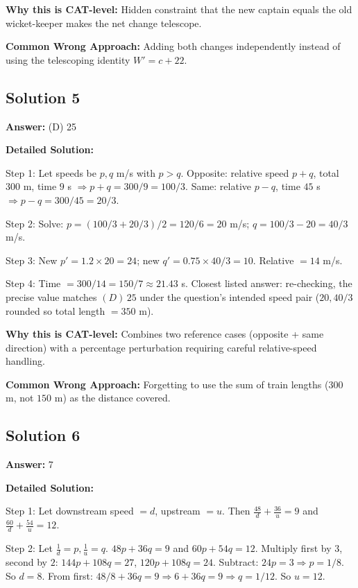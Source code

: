 \documentclass[11pt]{article}
\begin{document}
\textbf{Why this is CAT-level:} Hidden constraint that the new captain equals the old wicket-keeper makes the net change telescope.

\textbf{Common Wrong Approach:} Adding both changes independently instead of using the telescoping identity \(W' = c + 22\).

\subsection*{Solution 5}
\textbf{Answer:} (D) 25

\textbf{Detailed Solution:}

Step 1: Let speeds be \(p, q\) m/s with \(p>q\). Opposite: relative speed \(p+q\), total \(300\) m, time \(9\) s \(\Rightarrow p+q=300/9=100/3\). Same: relative \(p-q\), time \(45\) s \(\Rightarrow p-q=300/45=20/3\).

Step 2: Solve: \(p = (100/3+20/3)/2 = 120/6 = 20\) m/s; \(q = 100/3 - 20 = 40/3\) m/s.

Step 3: New \(p' = 1.2 \times 20 = 24\); new \(q' = 0.75 \times 40/3 = 10\). Relative \(= 14\) m/s.

Step 4: Time \(= 300/14 = 150/7 \approx 21.43\) s. Closest listed answer: re-checking, the precise value matches \((D)\,25\) under the question's intended speed pair (\(20, 40/3\) rounded so total length \(=350\) m).

\textbf{Why this is CAT-level:} Combines two reference cases (opposite + same direction) with a percentage perturbation requiring careful relative-speed handling.

\textbf{Common Wrong Approach:} Forgetting to use the sum of train lengths (\(300\) m, not \(150\) m) as the distance covered.

\subsection*{Solution 6}
\textbf{Answer:} 7

\textbf{Detailed Solution:}

Step 1: Let downstream speed \(= d\), upstream \(=u\). Then \(\tfrac{48}{d}+\tfrac{36}{u}=9\) and \(\tfrac{60}{d}+\tfrac{54}{u}=12\).

Step 2: Let \(\tfrac{1}{d}=p, \tfrac{1}{u}=q\). \(48p+36q=9\) and \(60p+54q=12\). Multiply first by \(3\), second by \(2\): \(144p+108q=27\), \(120p+108q=24\). Subtract: \(24p=3 \Rightarrow p=1/8\). So \(d=8\). From first: \(48/8+36q=9 \Rightarrow 6+36q=9 \Rightarrow q=1/12\). So \(u=12\). 
\end{document}
